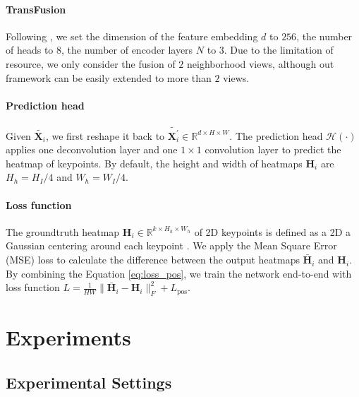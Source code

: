 \documentclass{bmvc2k}
\begin{document}
\vspace{-1.0em}
\paragraph{TransFusion} 
Following \cite{carion2020end, yang2020transpose}, we set the dimension of the feature embedding $d$ to $256$, the number of heads to $8$, the number of encoder layers $N$ to $3$. Due to the limitation of resource, we only consider the fusion of $2$ neighborhood views, although out framework can be easily extended to more than $2$ views. 

\vspace{-1.0em}
\paragraph{Prediction head}
Given $\tilde{\mathbf{X}_i}$, we first reshape it back to $\tilde{\mathbf{X}_i^{'}} \in \mathbb{R}^{d \times H \times W}$. The prediction head $\mathcal{H}(\cdot)$ applies one deconvolution layer and one $1 \times 1$ convolution layer to predict the heatmap of keypoints. By default, the height and width of heatmaps $\mathbf{H}_i$ are $H_h= H_I / 4$ and $W_h = W_I / 4$. 


\vspace{-1.0em}
\paragraph{Loss function} 
The groundtruth heatmap $\mathbf{H}_i \in \mathbb{R}^{k \times H_h \times W_h} $ of 2D keypoints is defined as a 2D a Gaussian centering around each keypoint \cite{wei2016convolutional}. We apply the Mean Square Error (MSE) loss to calculate the difference between the output heatmaps $ \bar{\mathbf{H}}_i$ and $\mathbf{H}_i$. By combining the Equation \ref{eq:loss_pos}, we train the network end-to-end with loss function $L = \frac{1}{HW} \parallel \bar{\mathbf{H}}_i - \mathbf{H}_i \parallel_F^2 + L_{\text{pos}}$. 




\vspace{-0.5em}
\section{Experiments}
\vspace{-0.8em}
\subsection{Experimental Settings}
\vspace{-0.5em}
\end{document}
